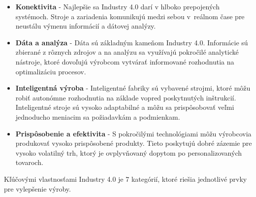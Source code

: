 \begin{itemize}
    \item \textbf{Konektivita} - Najlepšie sa Industry 4.0 darí v hlboko prepojených systémoch. Stroje a zariadenia komunikujú medzi sebou v~reálnom čase pre neustálu výmenu informácií a dátovej analýzy. %
    
    \item \textbf{Dáta a analýza} - Dáta sú základným kameňom Industry 4.0. Informácie sú zbierané z rôznych zdrojov a na analýzu sa využívajú pokročilé analytické nástroje, ktoré dovoľujú výrobcom vytvárať informované rozhodnutia na optimalizáciu procesov.
    
    \item \textbf{Inteligentná výroba} - Inteligentné fabriky sú vybavené strojmi, ktoré môžu robiť autonómne rozhodnutia na základe vopred poskytnutých inštrukcií. Inteligentné stroje sú vysoko adaptabilné a môžu sa prispôsobovať veľmi jednoducho meniacim sa požiadavkám a podmienkam.
    
    \item \textbf{Prispôsobenie a efektivita} - S pokročilými technológiami môžu výrobcovia produkovať vysoko prispôsobené produkty. Tieto poskytujú dobré zázemie pre vysoko volatilný trh, ktorý je ovplyvňovaný dopytom po personalizovaných tovaroch.
\end{itemize}

Kľúčovými vlastnosťami Industry 4.0 je 7 kategórií, ktoré riešia jednotlivé prvky pre vylepšenie výroby. 

